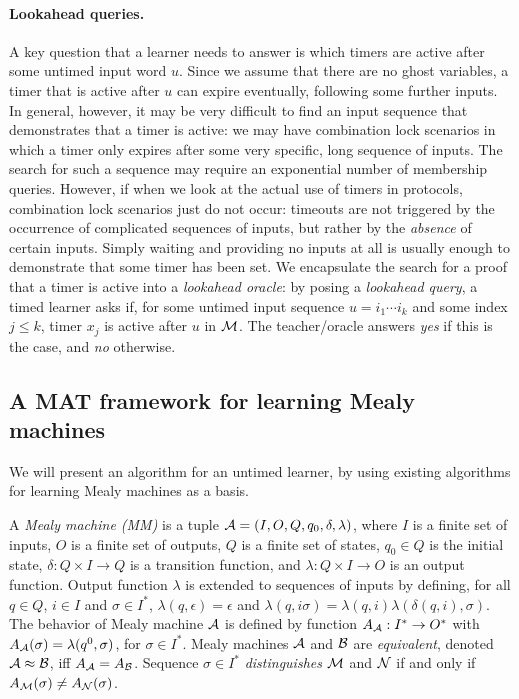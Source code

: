 \paragraph{Lookahead queries.}
A key question that a learner needs to answer is which timers are active after some untimed input word $u$.
Since we assume that there are no ghost variables, a timer that is active after $u$ can expire eventually,
following some further inputs.
In general, however, it may be very difficult to find an input sequence that demonstrates that a timer is active: we may have combination lock scenarios
in which a timer only expires after some very specific, long sequence of inputs.
The search for such a sequence may require an exponential number of membership queries.
However, if when we look at the actual use of timers in protocols, combination lock scenarios just do not occur:
timeouts are not triggered by the occurrence of complicated sequences of inputs, 
but rather by the \emph{absence} of certain inputs.
Simply waiting and providing no inputs at all is usually enough to demonstrate that some timer has been set.
We encapsulate the search for a proof that a timer is active into a \emph{lookahead oracle}:
by posing a \emph{lookahead query}, a timed learner asks if, for some untimed input sequence $u = i_1 \cdots i_k$ and some
index $j \leq k$, timer $x_j$ is active after $u$ in ${\cal M}$.
The teacher/oracle answers \emph{yes} if this is the case, and \emph{no} otherwise.

\subsection{A MAT framework for learning Mealy machines}
We will present an algorithm for an untimed learner, by using existing algorithms for learning Mealy machines as a basis.

A \emph{Mealy machine (MM)} is a tuple ${\cal A} = (I, O, Q, q_0, \delta, \lambda)$, where
$I$ is a finite set of inputs,
$O$ is a finite set of outputs,
$Q$ is a finite set of states,
$q_0 \in Q$ is the initial state,
$\delta: Q \times I \rightarrow Q$ is a transition function, and
$\lambda: Q \times I \rightarrow O$ is an output function.
%
Output function $\lambda$ is extended to sequences of inputs by defining,
for all $q \in Q$, $i \in I$ and $\sigma \in I^{\ast}$,
$\lambda(q, \epsilon) = \epsilon$ and $\lambda(q, i \sigma) = \lambda(q, i) \lambda(\delta(q, i), \sigma)$.
%
The behavior of Mealy machine ${\cal A}$ is defined by function $A_{\cal A} : I^{\ast} \rightarrow O^{\ast}$ with
$A_{\cal A}(\sigma) = \lambda (q^0, \sigma)$, for  $\sigma \in I^{\ast}$.
Mealy machines ${\cal A}$ and ${\cal B}$ are \emph{equivalent}, denoted ${\cal A} \approx {\cal B}$, iff $A_{{\cal A}} = A_{{\cal B}}$.
Sequence $\sigma \in I^{\ast}$ \emph{distinguishes}
${\cal M}$ and ${\cal N}$ if and only if $A_{{\cal M}}(\sigma) \neq A_{{\cal N}}(\sigma)$.

